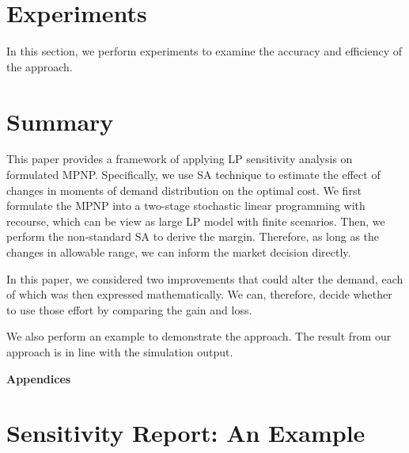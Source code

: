 \documentclass[a4paper,11pt]{article}
\begin{document}
\section{Experiments}
\label{se:experiment}

In this section, we perform experiments to examine the accuracy and efficiency of the approach.


\section{Summary}
\label{se:conclusion}
This paper provides a framework of applying LP sensitivity analysis on formulated MPNP. Specifically, we use SA technique to estimate the effect of changes in moments of demand distribution on the optimal cost. We first formulate the MPNP into a two-stage stochastic linear programming with recourse, which can be view as large LP model with finite scenarios. Then, we perform the non-standard SA to derive the margin. Therefore, as long as the changes in allowable range, we can inform the market decision directly.

In this paper, we considered two improvements that could alter the demand, each of which was then expressed mathematically. We can, therefore, decide whether to use those effort by comparing the gain and loss.

We also perform an example to demonstrate the approach. The result from our approach is in line with the simulation output.

\printbibliography
\newpage
\begin{center}
{\bf\Large Appendices}
\end{center}

\appendix

\section{Sensitivity Report: An Example}
\label{se:report}
\end{document}
